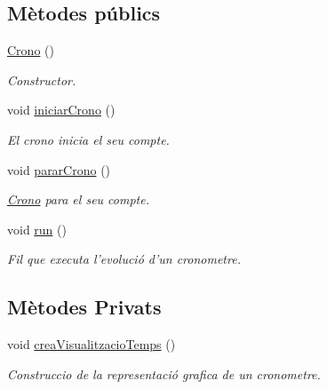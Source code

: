 \subsection*{Mètodes públics}
\begin{DoxyCompactItemize}
\item 
\hyperlink{classinterficie_1_1components_1_1_crono_afd62bd4f1354e15c5b7048c4f874bae3}{Crono} ()
\begin{DoxyCompactList}\small\item\em Constructor. \end{DoxyCompactList}\item 
void \hyperlink{classinterficie_1_1components_1_1_crono_aa890cf3bea27a9c0822bf6066de35929}{iniciar\+Crono} ()
\begin{DoxyCompactList}\small\item\em El crono inicia el seu compte. \end{DoxyCompactList}\item 
void \hyperlink{classinterficie_1_1components_1_1_crono_a0d8681481d3795a79da8a6c47dac8811}{parar\+Crono} ()
\begin{DoxyCompactList}\small\item\em \hyperlink{classinterficie_1_1components_1_1_crono}{Crono} para el seu compte. \end{DoxyCompactList}\item 
\hypertarget{classinterficie_1_1components_1_1_crono_a0ecb7df579cc0a6476c56517afd50627}{void \hyperlink{classinterficie_1_1components_1_1_crono_a0ecb7df579cc0a6476c56517afd50627}{run} ()}\label{classinterficie_1_1components_1_1_crono_a0ecb7df579cc0a6476c56517afd50627}

\begin{DoxyCompactList}\small\item\em Fil que executa l'evolució d'un cronometre. \end{DoxyCompactList}\end{DoxyCompactItemize}
\subsection*{Mètodes Privats}
\begin{DoxyCompactItemize}
\item 
void \hyperlink{classinterficie_1_1components_1_1_crono_a9bbe11279ed444c01881a7babbc500d2}{crea\+Visualitzacio\+Temps} ()
\begin{DoxyCompactList}\small\item\em Construccio de la representació grafica de un cronometre. \end{DoxyCompactList}\end{DoxyCompactItemize}


